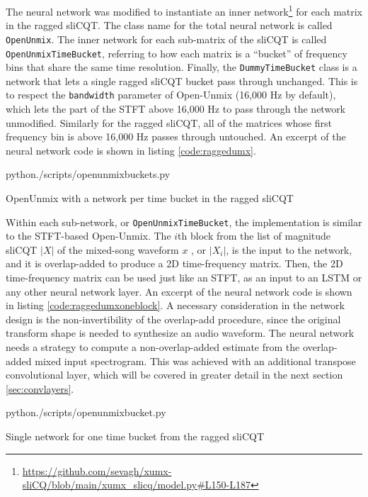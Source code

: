 \documentclass[report.tex]{subfiles}
\begin{document}
The neural network was modified to instantiate an inner network\footnote{\url{https://github.com/sevagh/xumx-sliCQ/blob/main/xumx_slicq/model.py\#L150-L187}} for each matrix in the ragged sliCQT. The class name for the total neural network is called \Verb#OpenUnmix#. The inner network for each sub-matrix of the sliCQT is called \Verb#OpenUnmixTimeBucket#, referring to how each matrix is a ``bucket'' of frequency bins that share the same time resolution. Finally, the \Verb#DummyTimeBucket# class is a network that lets a single ragged sliCQT bucket pass through unchanged. This is to respect the \Verb#bandwidth# parameter of Open-Unmix (16,000 Hz by default), which lets the part of the STFT above 16,000 Hz to pass through the network unmodified. Similarly for the ragged sliCQT, all of the matrices whose first frequency bin is above 16,000 Hz passes through untouched. An excerpt of the neural network code is shown in listing \ref{code:raggedumx}.

\begin{listing}[ht]
  \centering
\begin{inputminted}[linenos,breaklines,frame=single,fontsize=\scriptsize]{python}{./scripts/openunmixbuckets.py}
\end{inputminted}
  \caption{OpenUnmix with a network per time bucket in the ragged sliCQT}
  \label{code:raggedumx}
\end{listing}

Within each sub-network, or \Verb#OpenUnmixTimeBucket#, the implementation is similar to the STFT-based Open-Unmix. The $i$th block from the list of magnitude sliCQT $|X|$ of the mixed-song waveform $x$ , or $|X_{i}|$, is the input to the network, and it is overlap-added to produce a 2D time-frequency matrix. Then, the 2D time-frequency matrix can be used just like an STFT, as an input to an LSTM or any other neural network layer. An excerpt of the neural network code is shown in listing \ref{code:raggedumxoneblock}.  A necessary consideration in the network design is the non-invertibility of the overlap-add procedure, since the original transform shape is needed to synthesize an audio waveform. The neural network needs a strategy to compute a non-overlap-added estimate from the overlap-added mixed input spectrogram. This was achieved with an additional transpose convolutional layer, which will be covered in greater detail in the next section \ref{sec:convlayers}.

\begin{listing}[ht]
  \centering
\begin{inputminted}[linenos,breaklines,frame=single,fontsize=\scriptsize]{python}{./scripts/openunmixbucket.py}
\end{inputminted}
  \caption{Single network for one time bucket from the ragged sliCQT}
  \label{code:raggedumxoneblock}
\end{listing}
\end{document}
